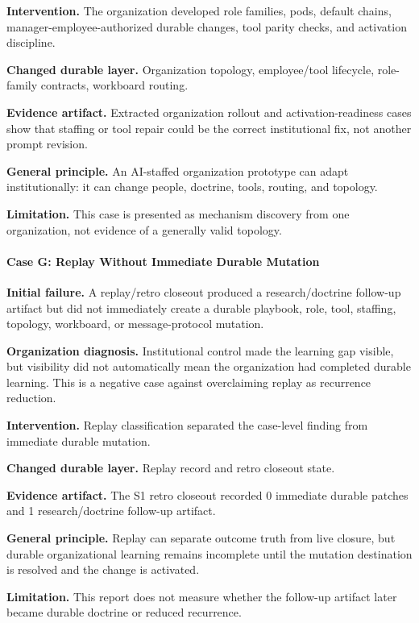 \documentclass[
]{article}
\begin{document}
\textbf{Intervention.} The organization developed role families, pods, default chains, manager-employee-authorized durable changes, tool parity checks, and activation discipline.

\textbf{Changed durable layer.} Organization topology, employee/tool lifecycle, role-family contracts, workboard routing.

\textbf{Evidence artifact.} Extracted organization rollout and activation-readiness cases show that staffing or tool repair could be the correct institutional fix, not another prompt revision.

\textbf{General principle.} An AI-staffed organization prototype can adapt institutionally: it can change people, doctrine, tools, routing, and topology.

\textbf{Limitation.} This case is presented as mechanism discovery from one organization, not evidence of a generally valid topology.

\paragraph{Case G: Replay Without Immediate Durable Mutation}\label{case-g-replay-without-immediate-durable-mutation}

\textbf{Initial failure.} A replay/retro closeout produced a research/doctrine follow-up artifact but did not immediately create a durable playbook, role, tool, staffing, topology, workboard, or message-protocol mutation.

\textbf{Organization diagnosis.} Institutional control made the learning gap visible, but visibility did not automatically mean the organization had completed durable learning. This is a negative case against overclaiming replay as recurrence reduction.

\textbf{Intervention.} Replay classification separated the case-level finding from immediate durable mutation.

\textbf{Changed durable layer.} Replay record and retro closeout state.

\textbf{Evidence artifact.} The S1 retro closeout recorded 0 immediate durable patches and 1 research/doctrine follow-up artifact.

\textbf{General principle.} Replay can separate outcome truth from live closure, but durable organizational learning remains incomplete until the mutation destination is resolved and the change is activated.

\textbf{Limitation.} This report does not measure whether the follow-up artifact later became durable doctrine or reduced recurrence.
\end{document}
